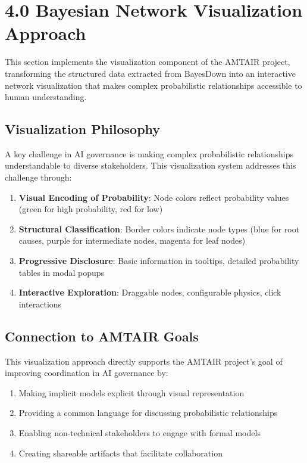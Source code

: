 \documentclass[
  11pt,
  letterpaper,
]{book}
\providecommand{\tightlist}{%
  \setlength{\itemsep}{0pt}\setlength{\parskip}{0pt}}
\begin{document}
\section{4.0 Bayesian Network Visualization
Approach}\label{bayesian-network-visualization-approach}

This section implements the visualization component of the AMTAIR
project, transforming the structured data extracted from BayesDown into
an interactive network visualization that makes complex probabilistic
relationships accessible to human understanding.

\subsection{Visualization Philosophy}\label{visualization-philosophy}

A key challenge in AI governance is making complex probabilistic
relationships understandable to diverse stakeholders. This visualization
system addresses this challenge through:

\begin{enumerate}
\def\labelenumi{\arabic{enumi}.}
\tightlist
\item
  \textbf{Visual Encoding of Probability}: Node colors reflect
  probability values (green for high probability, red for low)
\item
  \textbf{Structural Classification}: Border colors indicate node types
  (blue for root causes, purple for intermediate nodes, magenta for leaf
  nodes)
\item
  \textbf{Progressive Disclosure}: Basic information in tooltips,
  detailed probability tables in modal popups
\item
  \textbf{Interactive Exploration}: Draggable nodes, configurable
  physics, click interactions
\end{enumerate}

\subsection{Connection to AMTAIR
Goals}\label{connection-to-amtair-goals}

This visualization approach directly supports the AMTAIR project's goal
of improving coordination in AI governance by:

\begin{enumerate}
\def\labelenumi{\arabic{enumi}.}
\tightlist
\item
  Making implicit models explicit through visual representation
\item
  Providing a common language for discussing probabilistic relationships
\item
  Enabling non-technical stakeholders to engage with formal models
\item
  Creating shareable artifacts that facilitate collaboration
\end{enumerate}
\end{document}
